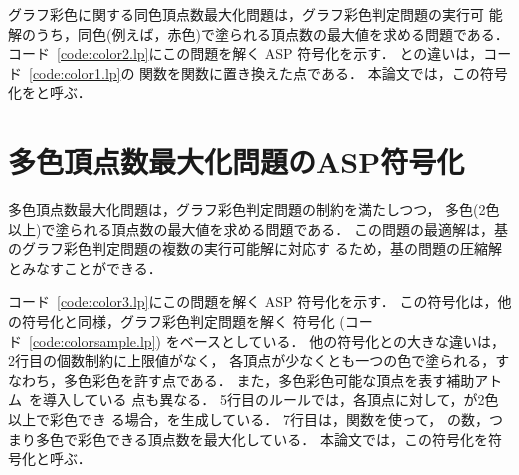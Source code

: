 グラフ彩色に関する同色頂点数最大化問題は，グラフ彩色判定問題の実行可
能解のうち，同色(例えば，赤色)で塗られる頂点数の最大値を求める問題である．
コード~\ref{code:color2.lp}にこの問題を解く ASP 符号化を示す．
との違いは，コード~\ref{code:color1.lp}の
関数を関数に置き換えた点である．
%
本論文では，この符号化をと呼ぶ．

\section{多色頂点数最大化問題のASP符号化}



多色頂点数最大化問題は，グラフ彩色判定問題の制約を満たしつつ，
多色(2色以上)で塗られる頂点数の最大値を求める問題である．
この問題の最適解は，基のグラフ彩色判定問題の複数の実行可能解に対応す
るため，基の問題の圧縮解とみなすことができる．

コード~\ref{code:color3.lp}にこの問題を解く ASP 符号化を示す．
この符号化は，他の符号化と同様，グラフ彩色判定問題を解く
符号化 (コード~\ref{code:colorsample.lp})
をベースとしている．
他の符号化との大きな違いは，2行目の個数制約に上限値がなく，
各頂点が少なくとも一つの色で塗られる，すなわち，多色彩色を許す点である．
また，多色彩色可能な頂点を表す補助アトム~を導入している
点も異なる．
5行目のルールでは，各頂点に対して，が2色以上で彩色でき
る場合，を生成している．
7行目は，関数を使って，
の数，つまり多色で彩色できる頂点数を最大化している．
%
本論文では，この符号化を符号化と呼ぶ．



